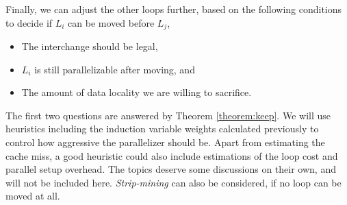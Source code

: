 



Finally, we can adjust the other loops further, based on the
following conditions to decide if $L_i$ can be moved before $L_j$,

\begin{itemize}
\item The interchange should be legal,
\item $L_i$ is still parallelizable after moving, and
\item The amount of data locality we are willing to sacrifice.
\end{itemize}

The first two questions are answered by Theorem \ref{theorem:keep}.
We will use heuristics including the induction variable weights
calculated previously to control how aggressive the parallelizer
should be. Apart from estimating the cache miss, a good heuristic could
also include estimations of the loop cost and parallel setup overhead. The
topics deserve some discussions on their own, and will not be
included here. \emph{Strip-mining} can also be considered, if no
loop can be moved at all.

